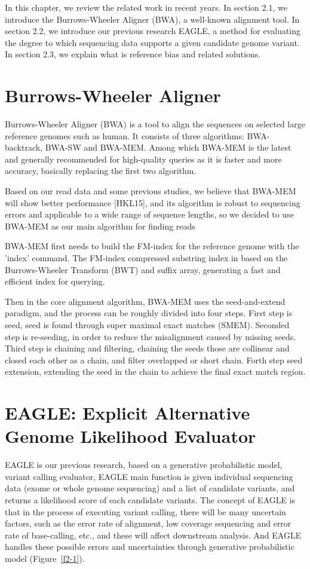 \hspace{24pt}
In this chapter, we review the related work in recent years. In section 2.1, we introduce the Burrows-Wheeler Aligner (BWA), a well-known alignment tool. In section 2.2, we introduce our previous research EAGLE, a method for evaluating the degree to which sequencing data supports a given candidate genome variant. In section 2.3, we explain what is reference bias and related solutions.
\section{Burrows-Wheeler Aligner}
Burrows-Wheeler Aligner (BWA) \cite{li2009fast} is a tool to align the sequences on selected large reference genomes such as human. It consists of three algorithms: BWA-backtrack, BWA-SW \cite{li2010fast} and BWA-MEM\cite{li2013aligning}. Among which BWA-MEM is the latest and generally recommended for high-quality queries as it is faster and more accuracy, basically replacing the first two algorithm.

Based on our read data and some previous studies, we believe that BWA-MEM will show better performance [HKL15], and its algorithm is robust to sequencing errors and applicable to a wide range of sequence lengths, so we decided to use BWA-MEM as our main algorithm for finding reads

BWA-MEM first needs to build the FM-index \cite{ferragina2005indexing} for the reference genome with the 'index' command.  The FM-index compressed substring index in based on the Burrows-Wheeler Transform (BWT) \cite{burrows1994block} and suffix array, generating a fast and efficient index for querying.

Then in the core alignment algorithm, BWA-MEM uses the seed-and-extend paradigm, and the process can be roughly divided into four steps. First step is seed, seed is found through super maximal exact matches (SMEM). Seconded step is re-seeding, in order to reduce the misalignment caused by missing seeds. Third step is chaining and filtering, chaining the seeds those are collinear and closed each other as a chain, and filter overlapped or short chain. Forth step seed extension, extending the seed in the chain to achieve the final exact match region.
\section{EAGLE: Explicit Alternative Genome Likelihood Evaluator}
EAGLE \cite{kuo2018eagle} is our previous research, based on a generative probabilistic model, variant calling evaluator, EAGLE main function is given individual sequencing data (exome or whole genome sequencing) and a list of candidate variants, and returns a likelihood score of each candidate variants.
The concept of EAGLE is that in the process of executing variant calling, there will be many uncertain factors, such as the error rate of alignment, low coverage sequencing and error rate of base-calling, etc., and these will affect downstream analysis. And EAGLE handles these possible errors and uncertainties through generative probabilistic model  (Figure~\ref{f2-1}).


